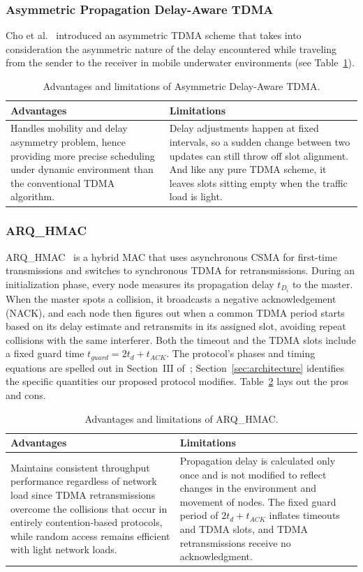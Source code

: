 \documentclass{article}
\newcommand{\advlim}[3]{%
\begin{table}[H]
\centering
\caption{#1}
\small
\setstretch{1.2}
\renewcommand{\arraystretch}{1.3}
\setlength{\tabcolsep}{8pt}
\begin{tabular}{|>{\raggedright\arraybackslash}p{0.42\textwidth}|>{\raggedright\arraybackslash}p{0.42\textwidth}|}
\hline
\textbf{Advantages} & \textbf{Limitations} \\
\hline
\rule{0pt}{3.2ex}#2\vspace{5pt} & \rule{0pt}{3.2ex}#3\vspace{5pt} \\
\hline
\end{tabular}
\end{table}}
\begin{document}
\subsubsection{Asymmetric Propagation Delay-Aware TDMA}
Cho et al.~\cite{cho2018} introduced an asymmetric TDMA scheme that takes into consideration the asymmetric nature of the delay encountered while traveling from the sender to the receiver in mobile underwater environments (see Table~\ref{tab:asym}).

\advlim{Advantages and limitations of Asymmetric Delay-Aware TDMA.\label{tab:asym}}
{Handles mobility and delay asymmetry problem, hence providing more precise scheduling under dynamic environment than the conventional TDMA algorithm.}
{Delay adjustments happen at fixed intervals, so a sudden change between two updates can still throw off slot alignment. And like any pure TDMA scheme, it leaves slots sitting empty when the traffic load is light.}

\subsubsection{ARQ\_HMAC}
ARQ\_HMAC~\cite{dao2025} is a hybrid MAC that uses asynchronous CSMA for first-time transmissions and switches to synchronous TDMA for retransmissions. During an initialization phase, every node measures its propagation delay $t_{D_i}$ to the master. When the master spots a collision, it broadcasts a negative acknowledgement (NACK), and each node then figures out when a common TDMA period starts based on its delay estimate and retransmits in its assigned slot, avoiding repeat collisions with the same interferer. Both the timeout and the TDMA slots include a fixed guard time $t_{guard} = 2t_d + t_{ACK}$. The protocol's phases and timing equations are spelled out in Section~III of~\cite{dao2025}; Section~\ref{sec:architecture} identifies the specific quantities our proposed protocol modifies. Table~\ref{tab:arqhmac} lays out the pros and cons.

\advlim{Advantages and limitations of ARQ\_HMAC.\label{tab:arqhmac}}
{Maintains consistent throughput performance regardless of network load since TDMA retransmissions overcome the collisions that occur in entirely contention-based protocols, while random access remains efficient with light network loads.}
{Propagation delay is calculated only once and is not modified to reflect changes in the environment and movement of nodes. The fixed guard period of $2t_d + t_{ACK}$ inflates timeouts and TDMA slots, and TDMA retransmissions receive no acknowledgment.}
\end{document}
